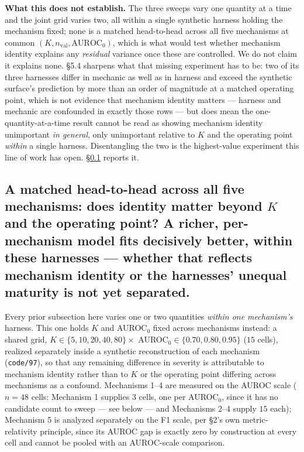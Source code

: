 \documentclass[10pt]{article} %
\begin{document}
\textbf{What this does not establish.} The three sweeps vary one quantity at a
time and the joint grid varies two, all within a single synthetic harness
holding the mechanism fixed; none is a matched head-to-head across all five
mechanisms at common $(K, n_{\text{val}}, \text{AUROC}_0)$, which is what would
test whether mechanism identity explains any \emph{residual} variance once
these are controlled. We do not claim it explains none. §5.4 sharpens what that
missing experiment has to be: two of its three harnesses differ in mechanic as
well as in harness and exceed the synthetic surface's prediction by more than
an order of magnitude at a matched operating point, which is not evidence that
mechanism identity matters --- harness and mechanic are confounded in exactly
those rows --- but does mean the one-quantity-at-a-time result cannot be read
as showing mechanism identity unimportant \emph{in general}, only unimportant
relative to $K$ and the operating point \emph{within} a single harness.
Disentangling the two is the highest-value experiment this line of work has
open. \S\ref{sec:head-to-head} reports it.

\subsection{A matched head-to-head across all five mechanisms: does identity matter beyond $K$ and the operating point? A richer, per-mechanism model fits decisively better, within these harnesses --- whether that reflects mechanism identity or the harnesses' unequal maturity is not yet separated.}
\label{sec:head-to-head}

Every prior subsection here varies one or two quantities \emph{within one
mechanism's} harness. This one holds $K$ and AUROC$_0$ fixed across
mechanisms instead: a shared grid, $K\in\{5,10,20,40,80\}\times$
AUROC$_0\in\{0.70,0.80,0.95\}$ ($15$ cells), realized separately inside a
synthetic reconstruction of each mechanism (\texttt{code/97}), so that any
remaining difference in severity is attributable to mechanism identity rather
than to $K$ or the operating point differing across mechanisms as a
confound. Mechanisms 1--4 are measured on the AUROC scale ($n{=}48$ cells:
Mechanism 1 supplies $3$ cells, one per AUROC$_0$, since it has no candidate
count to sweep --- see below --- and Mechanisms 2--4 supply $15$ each);
Mechanism 5 is analyzed separately on the F1 scale, per §2's own
metric-relativity principle, since its AUROC gap is exactly zero by
construction at every cell and cannot be pooled with an AUROC-scale
comparison.
\end{document}
